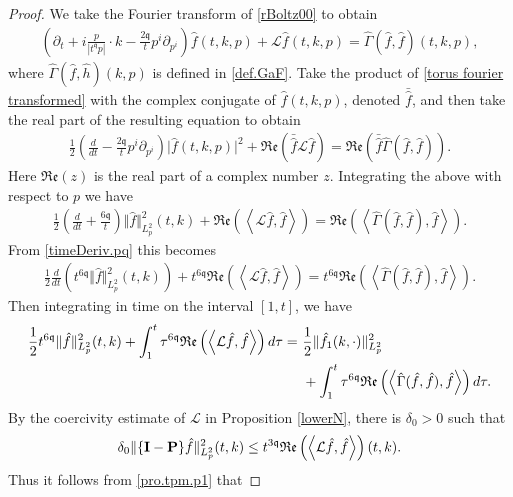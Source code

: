 \documentclass[reqno]{amsart}
\newcommand{\pv}{p}
\newcommand{\irnp}[2]{\left\langle {#1},{#2} \right\rangle}
\newcommand{\qq}{\mathfrak{q}}
\newcommand{\tq}{t^{\qq}}
\newcommand{\tTq}{t^{3\qq}}
\newcommand{\tQQq}{t^{6\qq}}
\newcommand{\linL}{\mathcal{L}}
\newcommand{\micro}{{\bf \{I- P\}}}
\newcommand{\de}{\delta}
\newcommand{\real}[1]{\mathfrak{Re}\left(#1\right)}
\theoremstyle{definition}
\numberwithin{equation}{section}
\numberwithin{theorem}{section}
\begin{document}
\begin{proof}
We take the Fourier transform of \eqref{rBoltz00} to obtain
\begin{align}\label{torus fourier transformed}
\left(\partial_t  + i\frac{\pv}{|\tq \pv|}\cdot k 
-\frac{2\qq }{t} p^i \partial_{p^i} \right) \hat{f}(t,k,\pv)
+\linL\hat{f}(t,k,\pv)=\widehat{\Gamma}(\hat{f},\hat{f})(t,k,\pv),
\end{align}
where $\hat{\Gamma}(\hat{f},\hat{h})(k,\pv)$ is defined in \eqref{def.GaF}.  Take the product of  \eqref{torus fourier transformed} with the complex conjugate of $\hat{f}(t,k,\pv)$, denoted $\bar{\hat{f}}$, and then take the real part of the resulting equation to obtain
\begin{align*}
\frac{1}{2}\left(\frac{d}{dt}   
-\frac{2\qq }{t} p^i \partial_{p^i} \right)
\vert \hat{f}(t,k,\pv)\vert^2
+\real{\bar{\hat{f}}\linL\hat{f} }
=\real{\bar{\hat{f}}\hat{\Gamma}(\hat{f},\hat{f})}.
\end{align*}
Here $\real{z}$ is the real part of a complex number $z$.
Integrating the above with respect to $\pv$ we have
\begin{align*}
    \frac{1}{2}\left(\frac{d}{dt}   
+\frac{6\qq }{t}  \right)\Vert \hat{f}\Vert_{L^2_{\pv}}^2(t,k)+ \real{\irnp{\linL\hat{f}}{\hat{f}}}
= \real{\irnp{\hat{\Gamma}(\hat{f},\hat{f})}{\hat{f}}}.
\end{align*}
From \eqref{timeDeriv.pq} this becomes
\begin{align}\label{eqn.complex}
    \frac{1}{2}\frac{d}{dt}  \left( \tQQq
\Vert \hat{f}\Vert_{L^2_{\pv}}^2(t,k)  \right)+ \tQQq\real{\irnp{\linL\hat{f}}{\hat{f}}}= \tQQq\real{\irnp{\hat{\Gamma}(\hat{f},\hat{f})}{\hat{f}}}.
\end{align}
Then integrating in time on the interval $[1,t]$, we have
\begin{align}\label{pro.tpm.p1}
\frac{1}{2} \tQQq \Vert \hat{f}\Vert_{L^2_{\pv}}^2(t,k)+\int^t_1  \tau^{6\qq}\real{\irnp{\linL\hat{f}}{\hat{f}}}d\tau=&~\frac{1}{2}\Vert \hat{f}_1(k,\cdot)\Vert_{L^2_{\pv}}^2
\\ \notag
&~+\int^t_1 \tau^{6\qq}\real{\irnp{\hat{\Gamma}(\hat{f},\hat{f})}{\hat{f}}}
d\tau.
\end{align}
By the coercivity estimate of $\linL$ in Proposition \ref{lowerN}, there is $\de_0>0$ such that
\begin{equation*}
\de_0\Vert \micro \hat{f} \Vert_{L^2_{\pv}}^2(t,k)\le \tTq\real{\irnp{\linL\hat{f}}{\hat{f}}}(t,k).
\end{equation*}
Thus it follows from \eqref{pro.tpm.p1} that

\end{proof}
\end{document}
